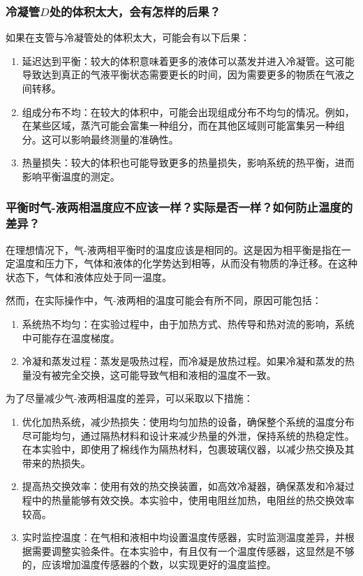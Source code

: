 \subsubsection{冷凝管$D$处的体积太大，会有怎样的后果？}

如果在支管与冷凝管处的体积太大，可能会有以下后果：

\begin{enumerate}
    \item 延迟达到平衡：较大的体积意味着更多的液体可以蒸发并进入冷凝管。这可能导致达到真正的气液平衡状态需要更长的时间，因为需要更多的物质在气液之间转移。
    \item 组成分布不均：在较大的体积中，可能会出现组成分布不均匀的情况。例如，在某些区域，蒸汽可能会富集一种组分，而在其他区域则可能富集另一种组分。这可以影响最终测量的准确性。
    \item 热量损失：较大的体积也可能导致更多的热量损失，影响系统的热平衡，进而影响平衡温度的测定。
\end{enumerate}

\subsubsection{平衡时气-液两相温度应不应该一样？实际是否一样？如何防止温度的差异？}

在理想情况下，气-液两相平衡时的温度应该是相同的。这是因为相平衡是指在一定温度和压力下，气体和液体的化学势达到相等，从而没有物质的净迁移。在这种状态下，气体和液体应处于同一温度。

然而，在实际操作中，气-液两相的温度可能会有所不同，原因可能包括：

\begin{enumerate}
    \item 系统热不均匀：在实验过程中，由于加热方式、热传导和热对流的影响，系统中可能存在温度梯度。
    \item 冷凝和蒸发过程：蒸发是吸热过程，而冷凝是放热过程。如果冷凝和蒸发的热量没有被完全交换，这可能导致气相和液相的温度不一致。
\end{enumerate}

为了尽量减少气-液两相温度的差异，可以采取以下措施：

\begin{enumerate}
    \item 优化加热系统，减少热损失：使用均匀加热的设备，确保整个系统的温度分布尽可能均匀，通过隔热材料和设计来减少热量的外泄，保持系统的热稳定性。在本实验中，即使用了棉线作为隔热材料，包裹玻璃仪器，以减少热交换及其带来的热损失。
    \item 提高热交换效率：使用有效的热交换装置，如高效冷凝器，确保蒸发和冷凝过程中的热量能够有效交换。本实验中，使用电阻丝加热，电阻丝的热交换效率较高。
    \item 实时监控温度：在气相和液相中均设置温度传感器，实时监测温度差异，并根据需要调整实验条件。在本实验中，有且仅有一个温度传感器，这显然是不够的，应该增加温度传感器的个数，以实现更好的温度监控。
\end{enumerate}

